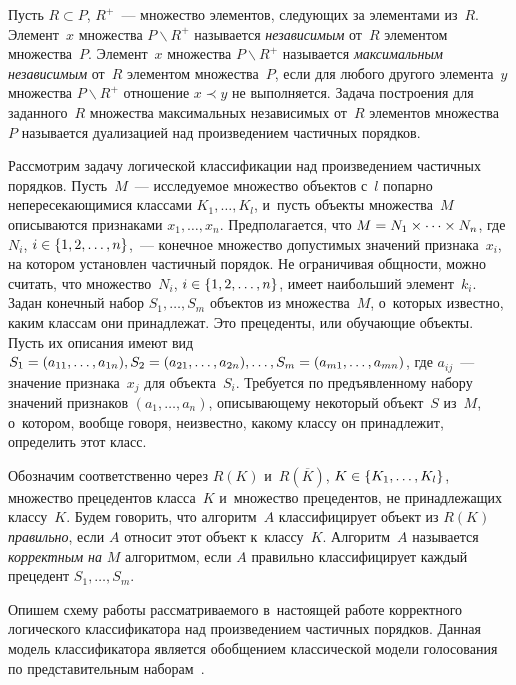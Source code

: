 \begin{multicols}{2}
  Пусть $R\subset P$, $R^+$~--- множество элементов, следующих за 
элементами из~$R$. Элемент~$x$ множества $P\backslash R^+$ называется 
\textit{независимым} от~$R$ элементом множества~$P$. Элемент~$x$ 
множества $P\backslash R^+$ называется \textit{максимальным независимым} 
от~$R$ элементом множества~$P$, если для любого другого элемента~$y$ 
множества $P\backslash R^+$ отношение $x \prec y$ не выполняется. Задача 
построения для заданного~$R$ множества максимальных независимых от~$R$ 
элементов множества~$P$ называется дуализацией над произведением 
частичных порядков. 
  
  Рассмотрим задачу логической классификации над произведением частичных 
порядков. Пусть~$M$~--- исследуемое множество объектов с~$l$ попарно 
непересекающимися классами $K_1,\ldots , K_l$, и~пусть объекты 
множества~$M$ описываются признаками $x_1,\ldots , x_n$. Предполагается, 
что $M\hm= N_1\times \cdots\times N_n$, где $N_i$, $i\hm\in  
\{1,2,\ldots , n\}$,~--- конечное множество допустимых значений 
признака~$x_i$, на котором установлен частичный порядок. Не ограничивая 
общности, можно считать, что множество~$N_i$, $i\hm\in \{1,2,\ldots , n\}$, 
имеет наибольший элемент~$k_i$. Задан конечный набор $S_1,\ldots , S_m$ 
объектов из множества~$M$, о~которых известно, каким классам они 
принадлежат. Это прецеденты, или обуча\-ющие объекты. Пусть их описания 
имеют вид $S_1\hm= (a_{11}, \ldots , a_{1n}), S_2\hm= (a_{21},\ldots , a_{2n}), 
\ldots , S_m\hm= (a_{m1},\ldots , a_{mn})$, где $a_{ij}$~--- значение 
признака~$x_j$ для объекта~$S_i$. Требуется по предъявленному набору 
значений признаков $(a_1, \ldots , a_n)$, описывающему некоторый объект~$S$ 
из~$M$, о~котором, вообще говоря, неизвестно, какому классу он 
принадлежит, определить этот класс.
  
  Обозначим соответственно через $R(K)$ и~$R(\overline{K})$, $K\hm\in \{ 
K_1, \ldots , K_l\}$, множество прецедентов класса~$K$ и~множество 
прецедентов, не принадлежащих классу~$K$. Будем говорить, что 
алгоритм~$A$ классифицирует объект из $R(K)$ \textit{правильно}, если $A$ 
относит этот объект к~классу~$K$. Алгоритм~$A$ называется 
\textit{корректным на} $M$ алгоритмом, если $A$ правильно классифицирует 
каждый прецедент $S_1,\ldots , S_m$.
  
  Опишем схему работы рассматриваемого в~настоящей работе корректного 
логического классификатора над произведением частичных порядков. Данная 
модель классификатора является обобщением классической модели 
голосования по представительным наборам~\cite{1-duk, 3-duk}.
  

\end{multicols}
